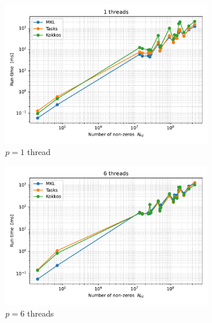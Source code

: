 \begin{figure}
  \centering
  \begin{subfigure}[t]{0.49\linewidth}
    \centering
    \includegraphics[width=\linewidth]{report/figures/results/runtime_vs_nnz_1.pdf}
    \caption{$p=1$ thread}
  \end{subfigure}
  \begin{subfigure}[t]{0.49\linewidth}
    \centering
    \includegraphics[width=\linewidth]{report/figures/results/runtime_vs_nnz_6.pdf}
    \caption{$p=6$ threads}
  \end{subfigure}
  \\
  \begin{subfigure}[t]{0.49\linewidth}
    \centering

\end{subfigure}
\end{figure}
